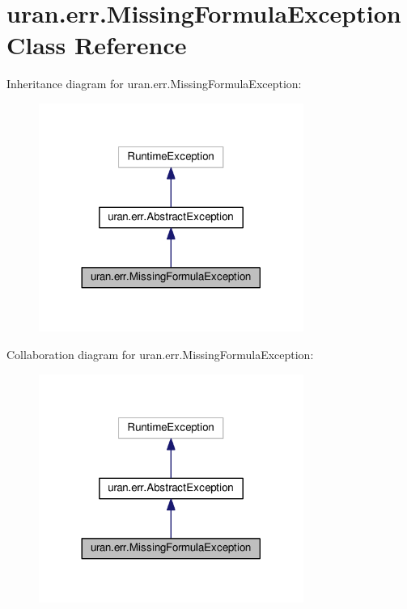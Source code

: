 \hypertarget{classuran_1_1err_1_1_missing_formula_exception}{}\section{uran.\+err.\+Missing\+Formula\+Exception Class Reference}
\label{classuran_1_1err_1_1_missing_formula_exception}


Inheritance diagram for uran.\+err.\+Missing\+Formula\+Exception\+:
\nopagebreak
\begin{figure}[H]
\begin{center}
\leavevmode
\includegraphics[width=245pt]{classuran_1_1err_1_1_missing_formula_exception__inherit__graph}
\end{center}
\end{figure}


Collaboration diagram for uran.\+err.\+Missing\+Formula\+Exception\+:
\nopagebreak
\begin{figure}[H]
\begin{center}
\leavevmode
\includegraphics[width=245pt]{classuran_1_1err_1_1_missing_formula_exception__coll__graph}
\end{center}
\end{figure}
